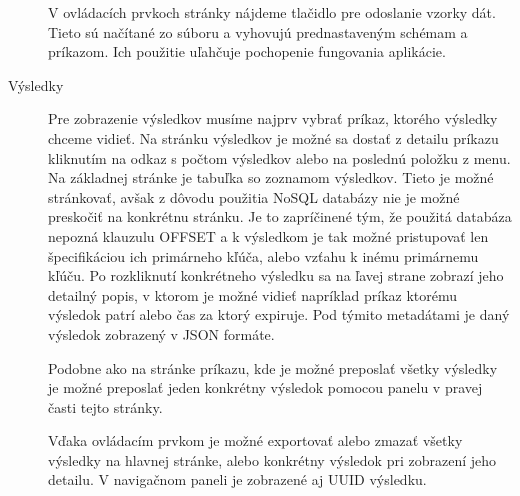 \begin{description}
		V ovládacích prvkoch stránky nájdeme tlačidlo pre odoslanie vzorky dát. Tieto sú načítané zo súboru a vyhovujú prednastaveným schémam a príkazom. Ich použitie uľahčuje pochopenie fungovania aplikácie.
		
		\item[Výsledky] Pre zobrazenie výsledkov musíme najprv vybrať príkaz, ktorého výsledky chceme vidieť. Na stránku výsledkov je možné sa dostať z detailu príkazu kliknutím na odkaz s počtom výsledkov alebo na poslednú položku z menu.
		Na základnej stránke je tabuľka so zoznamom výsledkov. Tieto je možné stránkovať, avšak z dôvodu použitia NoSQL databázy nie je možné preskočiť na konkrétnu stránku. Je to zapríčinené tým, že použitá databáza nepozná klauzulu OFFSET a k výsledkom je tak možné pristupovať len špecifikáciou ich primárneho kľúča, alebo vzťahu k inému primárnemu kľúču.
		Po rozkliknutí konkrétneho výsledku sa na ľavej strane zobrazí jeho detailný popis, v ktorom je možné vidieť napríklad príkaz ktorému výsledok patrí alebo čas za ktorý expiruje. Pod týmito metadátami je daný výsledok zobrazený v JSON formáte.
		
		Podobne ako na stránke príkazu, kde je možné preposlať všetky výsledky je možné preposlať jeden konkrétny výsledok pomocou panelu v pravej časti tejto stránky.

		Vďaka ovládacím prvkom je možné exportovať alebo zmazať všetky výsledky na hlavnej stránke, alebo konkrétny výsledok pri zobrazení jeho detailu. V navigačnom paneli je zobrazené aj UUID výsledku.
	\end{description}
	
	
	